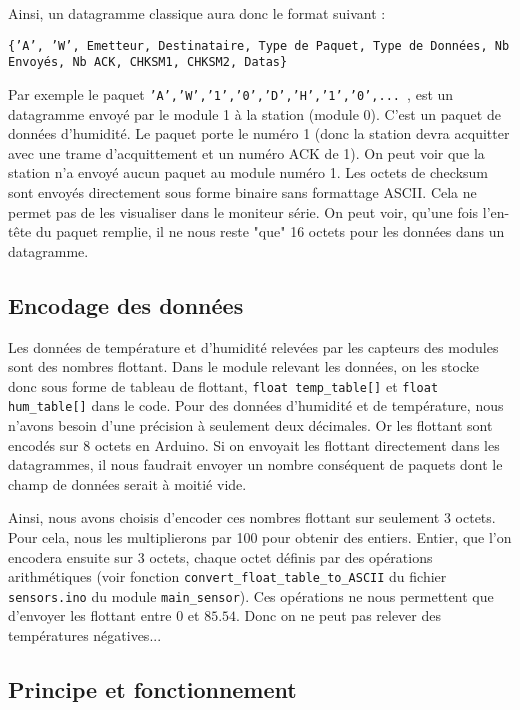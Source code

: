 \documentclass[a4paper]{article}
\begin{document}
Ainsi, un datagramme classique aura donc le format suivant : 
    \begin{center}
        \texttt{\{'A', 'W', Emetteur, Destinataire, Type de Paquet, Type de Données, Nb Envoyés, Nb ACK, CHKSM1, CHKSM2, Datas\}}
    \end{center}
Par exemple le paquet \texttt{'A','W','1','0','D','H','1','0',... }, est un datagramme envoyé 
par le module 1 à la station (module 0). C'est un paquet de données d'humidité. Le paquet porte le numéro 1 (donc la station
devra acquitter avec une trame d'acquittement et un numéro ACK de 1). On peut voir que la station n'a envoyé aucun paquet au 
module numéro 1. Les octets de checksum sont envoyés directement sous forme binaire sans formattage ASCII. 
Cela ne permet pas de les visualiser dans le moniteur série.   
On peut voir, qu'une fois l'en-tête du paquet remplie, il ne nous reste "que" 16 octets pour les données dans un datagramme. 

\subsection{Encodage des données}

Les données de température et d'humidité relevées par les capteurs des modules sont des nombres flottant. 
Dans le module relevant les données, on les stocke donc sous forme de tableau de flottant, \texttt{float temp\_table[]}
et \texttt{float hum\_table[]} dans le code. 
Pour des données d'humidité et de température, nous n'avons besoin d'une précision à seulement deux décimales. 
Or les flottant sont encodés sur 8 octets en Arduino. Si on envoyait les flottant directement dans les datagrammes, 
il nous faudrait envoyer un nombre conséquent de paquets dont le champ de données serait à moitié vide. 

Ainsi, nous avons choisis d'encoder ces nombres flottant sur seulement 3 octets. Pour cela, nous les multiplierons 
par 100 pour obtenir des entiers. Entier, que l'on encodera ensuite sur 3 octets, chaque octet définis par des opérations 
arithmétiques (voir fonction \texttt{convert\_float\_table\_to\_ASCII} du fichier \texttt{sensors.ino} du module \texttt{main\_sensor}). 
Ces opérations ne nous permettent que d'envoyer les flottant entre $0$ et $85.54$. Donc on ne peut pas relever des températures 
négatives...

\subsection{Principe et fonctionnement}
\end{document}

